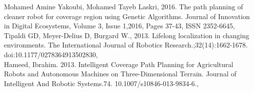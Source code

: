 \cleardoublepage
{}
{}
\begin{thebibliography}{99}

\texttt{}Mohamed Amine Yakoubi, Mohamed Tayeb Laskri, 2016. The path planning of cleaner robot for coverage region using Genetic Algorithms. Journal of Innovation in Digital Ecosystems, Volume 3, Issue 1,2016, Pages 37-43, ISSN 2352-6645\texttt{},\\ 

\texttt{}Tipaldi GD, Meyer-Delius D, Burgard W., 2013. Lifelong localization in changing environments. The International Journal of Robotics Research.;32(14):1662-1678. doi:10.1177/0278364913502830\texttt{},\\ 
\texttt{}Hameed, Ibrahim. 2013. Intelligent Coverage Path Planning for Agricultural Robots and Autonomous Machines on Three-Dimensional Terrain. Journal of Intelligent And Robotic Systems.74. 10.1007/s10846-013-9834-6.\texttt{},\\ 
\end{thebibliography}
